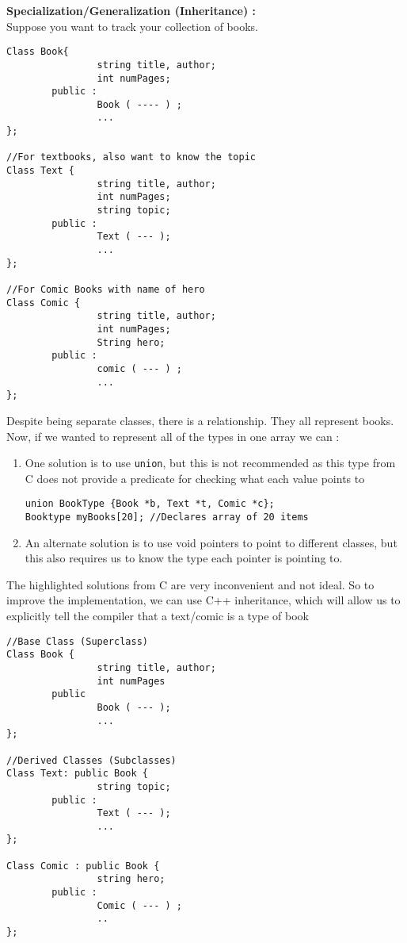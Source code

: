 \documentclass{article}
\begin{document}
\textbf{Specialization/Generalization (Inheritance) : }\\

Suppose you want to track your collection of books. 

\begin{lstlisting}
Class Book{
				string title, author;
				int numPages;
		public :
				Book ( ---- ) ;
				...
};

//For textbooks, also want to know the topic 
Class Text {
				string title, author;
				int numPages;
				string topic;
		public :
				Text ( --- );
				...
};

//For Comic Books with name of hero 
Class Comic {
				string title, author;
				int numPages;
				String hero; 
		public :
				comic ( --- ) ; 
				...
};
\end{lstlisting}

\newpage
 
Despite being separate classes, there is a relationship. They all represent books. Now, if we wanted to represent all of the types in one array we can : 

\begin{enumerate}
\item One solution is to use \verb|union|, but this is not recommended as this type from C does not provide a predicate for checking what each value points to 
\begin{lstlisting}
union BookType {Book *b, Text *t, Comic *c};
Booktype myBooks[20]; //Declares array of 20 items 
\end{lstlisting}
\item An alternate solution is to use void pointers to point to different classes, but this also requires us to know the type each pointer is pointing to. 
\end{enumerate}

The highlighted solutions from C are very inconvenient and not ideal. So to improve the implementation, we can use C++ inheritance, which will allow us to explicitly tell the compiler that a text/comic is a type of book

\begin{lstlisting} 
//Base Class (Superclass)
Class Book {
				string title, author; 
				int numPages
		public 
				Book ( --- ); 
				...
};

//Derived Classes (Subclasses)
Class Text: public Book {
				string topic;
		public :
				Text ( --- ); 
				...
};

Class Comic : public Book {
				string hero;
		public : 
				Comic ( --- ) ; 
			    ..
};
\end{lstlisting}
 
\end{document}
